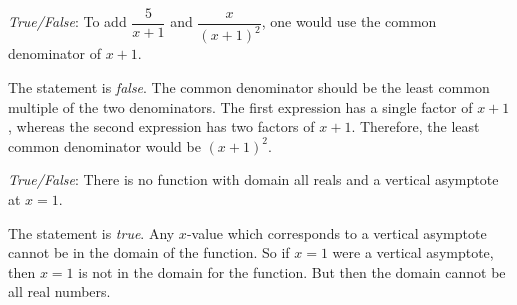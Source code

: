 \documentclass[11pt,letterpaper]{article}
\begin{document}
\quizsol \textit{True/False}: To add $\dfrac{5}{x + 1}$ and $\dfrac{x}{(x + 1)^2}$, one would use the common denominator of $x + 1$. \pspace

\sol The statement is \textit{false}. The common denominator should be the least common multiple of the two denominators. The first expression has a single factor of $x + 1$, whereas the second expression has two factors of $x + 1$. Therefore, the least common denominator would be $(x + 1)^2$. 



\quizsol \textit{True/False}: There is no function with domain all reals and a vertical asymptote at $x= 1$. \pspace

\sol The statement is \textit{true}. Any $x$-value which corresponds to a vertical asymptote cannot be in the domain of the function. So if $x= 1$ were a vertical asymptote, then $x= 1$ is not in the domain for the function. But then the domain cannot be all real numbers. 
\end{document}
